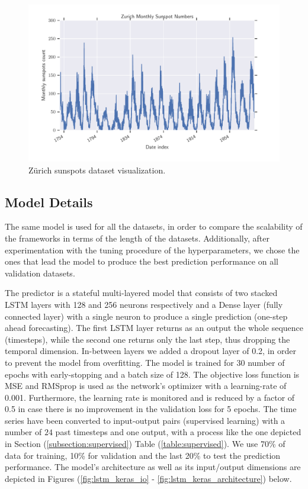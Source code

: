 \documentclass[a4paper, 12pt]{article}
\numberwithin{equation}{section}
\numberwithin{figure}{section}
\numberwithin{table}{section}
\begin{document}
	\begin{figure}[H]
		\centering
		\includegraphics[width=\textwidth, height=\textheight, keepaspectratio]{datasets/zurich.pdf}
		\caption{Zürich sunspots dataset visualization.}
		\label{fig:zurich_plot}
	\end{figure}

	\newpage

	\subsection{Model Details}
	
	The same model is used for all the datasets, in order to compare the scalability of the frameworks in terms of the length of the datasets. Additionally, after experimentation with the tuning procedure of the hyperparameters, we chose the ones that lead the model to produce the best prediction performance on all validation datasets.\par
	
	The predictor is a stateful multi-layered model that consists of two stacked LSTM layers with 128 and 256 neurons respectively and a Dense layer (fully connected layer) with a single neuron to produce a single prediction (one-step ahead forecasting). The first LSTM layer returns as an output the whole sequence (timesteps), while the second one returns only the last step, thus dropping the temporal dimension. In-between layers we added a dropout layer of 0.2, in order to prevent the model from overfitting. The model is trained for 30 number of epochs with early-stopping and a batch size of 128. The objective loss function is MSE and RMSprop \cite{rmsprop} is used as the network's optimizer with a learning-rate of 0.001. Furthermore, the learning rate is monitored and is reduced by a factor of 0.5 in case there is no improvement in the validation loss for 5 epochs. The time series have been converted to input-output pairs (supervised learning) with a number of $24$ past timesteps and one output, with a process like the one depicted in Section (\ref{subsection:supervised}) \textemdash Table (\ref{table:supervised}). We use 70\% of data for training, 10\% for validation and the last 20\% to test the prediction performance. The model's architecture as well as its input/output dimensions are depicted in Figures (\ref{fig:lstm_keras_io} - \ref{fig:lstm_keras_architecture}) below.
	
\end{document}
